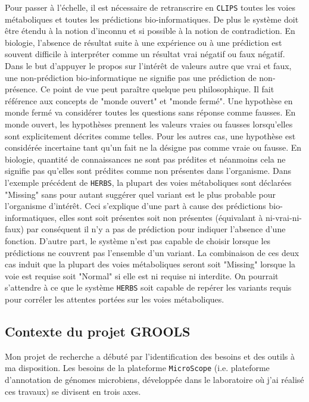 \begin{refsegment}
Pour passer à l'échelle, il est nécessaire de retranscrire  en \texttt{\gls{CLIPS}}  toutes les voies métaboliques et toutes les prédictions bio-informatiques. De plus le système doit être étendu à la notion d'inconnu et si possible à la notion de contradiction. En biologie, l’absence de résultat suite à une expérience ou à une prédiction est souvent difficile à interpréter comme un résultat vrai négatif ou faux négatif.  Dans le but d'appuyer le propos sur l'intérêt de valeurs autre que vrai et faux, une non-prédiction bio-informatique ne signifie pas une prédiction de non-présence. Ce point de vue peut paraître quelque peu philosophique. Il fait référence aux concepts de "monde ouvert" et "monde fermé". Une hypothèse en monde fermé va considérer toutes les questions sans réponse comme fausses. En monde ouvert, les hypothèses prennent les valeurs vraies ou fausses lorsqu'elles sont explicitement décrites comme telles. Pour les autres cas, une hypothèse est considérée incertaine tant qu'un fait ne la désigne pas comme vraie ou fausse. En biologie, quantité de connaissances ne sont pas prédites et néanmoins cela ne signifie pas qu'elles sont prédites comme non présentes dans l'organisme. Dans l’exemple précédent de \texttt{\gls{HERBS}}, la plupart des voies métaboliques sont déclarées "Missing" sans pour autant suggérer quel variant est le plus probable pour l'organisme d'intérêt. Ceci s'explique d'une part à cause des prédictions bio-informatiques, elles sont soit présentes soit non présentes (équivalant à ni-vrai-ni-faux) par conséquent il n'y a pas de prédiction pour indiquer l'absence d'une fonction. D'autre part, le système n'est pas capable de choisir lorsque les prédictions ne couvrent pas l'ensemble d'un variant.  La combinaison de ces deux cas induit que la plupart des voies métaboliques seront soit "Missing" lorsque la voie est requise soit "Normal" si elle est ni requise ni interdite. On pourrait s’attendre à ce que le système \texttt{\gls{HERBS}} soit capable de repérer les variants requis pour corréler les attentes portées sur les voies métaboliques.

\subsection{Contexte du projet GROOLS}

Mon projet de recherche a débuté par l'identification des besoins et des outils à ma disposition. Les besoins de la plateforme \texttt{MicroScope} (i.e. plateforme d’annotation de génomes microbiens, développée dans le laboratoire où j’ai réalisé ces travaux) se divisent en trois axes.


\end{refsegment}
